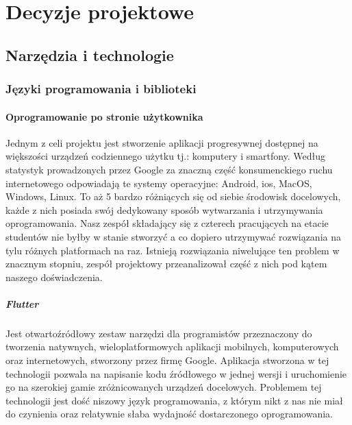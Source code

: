 
\chapter{Decyzje projektowe}
\label{ch:decyzje-projektowe}

\section{Narzędzia i technologie}
\label{sec:narzedzia-i-technologie}

\subsection{Języki programowania i biblioteki}
\label{subsec:jezyki-programowania-i-biblioteki}

\subsubsection{Oprogramowanie po stronie użytkownika}
Jednym z celi projektu jest stworzenie aplikacji progresywnej dostępnej na większości urządzeń codziennego użytku tj.: komputery i smartfony.
Według statystyk prowadzonych przez Google za znaczną część konsumenckiego ruchu internetowego odpowiadają te systemy operacyjne: Android, ios, MacOS, Windows, Linux.
To aż 5 bardzo różniących się od siebie środowisk docelowych, każde z nich posiada swój dedykowany sposób wytwarzania i utrzymywania oprogramowania.
Nasz zespół składający się z czterech pracujących na etacie studentów nie byłby w stanie stworzyć a co dopiero utrzymywać rozwiązania na tylu różnych platformach na raz.
Istnieją rozwiązania niwelujące ten problem w znacznym stopniu, zespół projektowy przeanalizował część z nich pod kątem naszego doświadczenia.

\paragraph{Flutter}
Jest otwartoźródłowy zestaw narzędzi dla programistów przeznaczony do tworzenia natywnych, wieloplatformowych aplikacji mobilnych, komputerowych oraz internetowych, stworzony przez firmę Google.
Aplikacja stworzona w tej technologii pozwala na napisanie kodu źródłowego w jednej wersji i uruchomienie go na szerokiej gamie zróżnicowanych urządzeń docelowych.
Problemem tej technologii jest dość niszowy język programowania, z którym nikt z nas nie miał do czynienia oraz relatywnie słaba wydajność dostarczonego oprogramowania.

